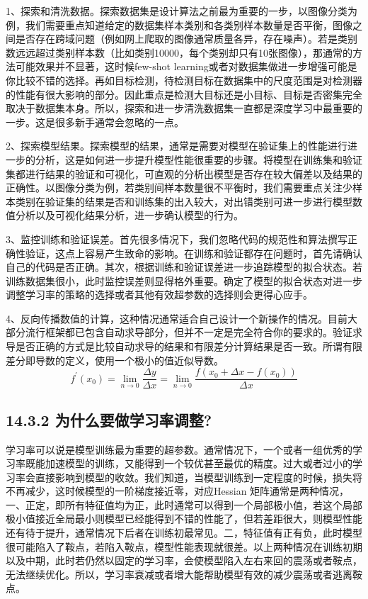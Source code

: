 1、探索和清洗数据。探索数据集是设计算法之前最为重要的一步，以图像分类为例，我们需要重点知道给定的数据集样本类别和各类别样本数量是否平衡，图像之间是否存在跨域问题（例如网上爬取的图像通常质量各异，存在噪声）。若是类别数远远超过类别样本数（比如类别10000，每个类别却只有10张图像），那通常的方法可能效果并不显著，这时候few-shot
learning或者对数据集做进一步增强可能是你比较不错的选择。再如目标检测，待检测目标在数据集中的尺度范围是对检测器的性能有很大影响的部分。因此重点是检测大目标还是小目标、目标是否密集完全取决于数据集本身。所以，探索和进一步清洗数据集一直都是深度学习中最重要的一步。这是很多新手通常会忽略的一点。

2、探索模型结果。探索模型的结果，通常是需要对模型在验证集上的性能进行进一步的分析，这是如何进一步提升模型性能很重要的步骤。将模型在训练集和验证集都进行结果的验证和可视化，可直观的分析出模型是否存在较大偏差以及结果的正确性。以图像分类为例，若类别间样本数量很不平衡时，我们需要重点关注少样本类别在验证集的结果是否和训练集的出入较大，对出错类别可进一步进行模型数值分析以及可视化结果分析，进一步确认模型的行为。

3、监控训练和验证误差。首先很多情况下，我们忽略代码的规范性和算法撰写正确性验证，这点上容易产生致命的影响。在训练和验证都存在问题时，首先请确认自己的代码是否正确。其次，根据训练和验证误差进一步追踪模型的拟合状态。若训练数据集很小，此时监控误差则显得格外重要。确定了模型的拟合状态对进一步调整学习率的策略的选择或者其他有效超参数的选择则会更得心应手。

4、反向传播数值的计算，这种情况通常适合自己设计一个新操作的情况。目前大部分流行框架都已包含自动求导部分，但并不一定是完全符合你的要求的。验证求导是否正确的方式是比较自动求导的结果和有限差分计算结果是否一致。所谓有限差分即导数的定义，使用一个极小的值近似导数。
\[
f^{'}(x_0) = \lim_{n\rightarrow0}\frac{\Delta y}{\Delta x} = \lim_{n\rightarrow0}\frac{f(x_0+\Delta x -f(x_0))}{\Delta x}
\]

\subsection{14.3.2
为什么要做学习率调整?}\label{ux4e3aux4ec0ux4e48ux8981ux505aux5b66ux4e60ux7387ux8c03ux6574}

​
学习率可以说是模型训练最为重要的超参数。通常情况下，一个或者一组优秀的学习率既能加速模型的训练，又能得到一个较优甚至最优的精度。过大或者过小的学习率会直接影响到模型的收敛。我们知道，当模型训练到一定程度的时候，损失将不再减少，这时候模型的一阶梯度接近零，对应Hessian
矩阵通常是两种情况，一、正定，即所有特征值均为正，此时通常可以得到一个局部极小值，若这个局部极小值接近全局最小则模型已经能得到不错的性能了，但若差距很大，则模型性能还有待于提升，通常情况下后者在训练初最常见。二，特征值有正有负，此时模型很可能陷入了鞍点，若陷入鞍点，模型性能表现就很差。以上两种情况在训练初期以及中期，此时若仍然以固定的学习率，会使模型陷入左右来回的震荡或者鞍点，无法继续优化。所以，学习率衰减或者增大能帮助模型有效的减少震荡或者逃离鞍点。

